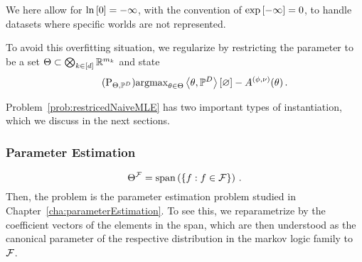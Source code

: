 We here allow for $\ln \left[ 0 \right]=-\infty$, with the convention of $\mathrm{exp}\left[-\infty\right]=0$, to handle datasets where specific worlds are not represented. 


To avoid this overfitting situation, we regularize by restricting the parameter to be a set $\Theta\subset\bigotimes_{k\in[d]} \mathbb{R}^{m_{k}}$ and state
\begin{align}\tag{$\mathrm{P}_{\energyhypothesis, \empdistribution}$}\label{prob:restrictedNaiveMLE}
	\argmax_{\canparam\in\energyhypothesis}  \sbcontraction{\canparam,\empdistribution} - \cumfunctionof{\canparam} \, . 
\end{align}

Problem~\ref{prob:restricedNaiveMLE} has two important types of instantiation, which we discuss in the next sections.

\subsubsection{Parameter Estimation}

	\[ \Theta^{\mathcal{F}} = \mathrm{span}\left(\{f : f\in\mathcal{F} \}\right) \, . \]
Then, the problem is the parameter estimation problem studied in Chapter~\ref{cha:parameterEstimation}.
To see this, we reparametrize by the coefficient vectors of the elements in the span, which are then understood as the canonical parameter of the respective distribution in the markov logic family to $\mathcal{F}$.


